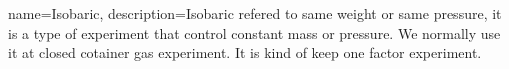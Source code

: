 {
name=Isobaric,
    description={Isobaric refered to same weight or same pressure, it is a type of experiment that control constant mass or pressure. We normally use it at closed cotainer gas experiment. It is kind of keep one factor experiment.}
}
